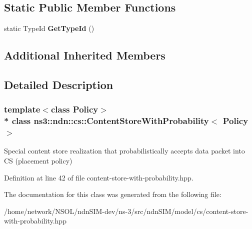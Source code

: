 \subsection*{Static Public Member Functions}
\begin{DoxyCompactItemize}
\item 
static Type\+Id {\bfseries Get\+Type\+Id} ()\hypertarget{classns3_1_1ndn_1_1cs_1_1ContentStoreWithProbability_a4ba97104e46c896f07f820a053812903}{}\label{classns3_1_1ndn_1_1cs_1_1ContentStoreWithProbability_a4ba97104e46c896f07f820a053812903}

\end{DoxyCompactItemize}
\subsection*{Additional Inherited Members}


\subsection{Detailed Description}
\subsubsection*{template$<$class Policy$>$\\*
class ns3\+::ndn\+::cs\+::\+Content\+Store\+With\+Probability$<$ Policy $>$}

Special content store realization that probabilistically accepts data packet into CS (placement policy) 

Definition at line 42 of file content-\/store-\/with-\/probability.\+hpp.



The documentation for this class was generated from the following file\+:\begin{DoxyCompactItemize}
\item 
/home/network/\+N\+S\+O\+L/ndn\+S\+I\+M-\/dev/ns-\/3/src/ndn\+S\+I\+M/model/cs/content-\/store-\/with-\/probability.\+hpp\end{DoxyCompactItemize}
